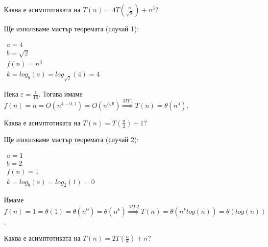 \begin{problem}
	Каква е асимптотиката на $T(n)=4T(\frac n{\sqrt2})+n^3$?
\end{problem}

\begin{solution}
	Ще използваме $\hyperref[th:master-theorem]{\text{мастър теоремата}}$ (случай 1):
	\begin{center}
		$\begin{array}{|l}
			a=4\\
			b=\sqrt2\\
			f(n)=n^3\\
			k=log_b(a)=log_{\sqrt2}(4)=4
		\end{array}$
	\end{center}
	Нека $\varepsilon=\frac1{10}$. Тогава имаме $f(n)=n=O(n^{4-0,1})=O(n^{3,9})\overset{MT\,1}{\Longrightarrow}T(n)=\theta(n^4)$.
\end{solution}

\newpage

\begin{problem}
	Каква е асимптотиката на $T(n)=T(\frac n2)+1$?
\end{problem}

\begin{solution}
	Ще използваме $\hyperref[th:master-theorem]{\text{мастър теоремата}}$ (случай 2):
	\begin{center}
		$\begin{array}{|l}
			a=1\\
			b=2\\
			f(n)=1\\
			k=log_b(a)=log_2(1)=0
		\end{array}$
	\end{center}
	Имаме $f(n)=1=\theta(1)=\theta(n^0)=\theta(n^k)\overset{MT\,2}{\Longrightarrow}T(n)=\theta(n^klog(n))=\theta(log(n))$.
\end{solution}\leavevmode\newline

\begin{problem}
	Каква е асимптотиката на $T(n)=2T(\frac n8)+n$?
\end{problem}

